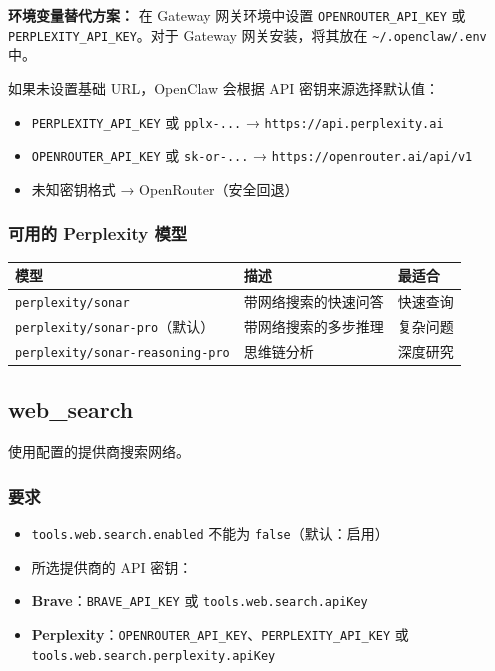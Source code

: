 \textbf{环境变量替代方案：} 在 Gateway 网关环境中设置 \texttt{OPENROUTER\_API\_KEY} 或 \texttt{PERPLEXITY\_API\_KEY}。对于 Gateway 网关安装，将其放在 \texttt{\textasciitilde{}/.openclaw/.env} 中。

如果未设置基础 URL，OpenClaw 会根据 API 密钥来源选择默认值：

\begin{itemize}
  \item \texttt{PERPLEXITY\_API\_KEY} 或 \texttt{pplx-...} → \texttt{https://api.perplexity.ai}
  \item \texttt{OPENROUTER\_API\_KEY} 或 \texttt{sk-or-...} → \texttt{https://openrouter.ai/api/v1}
  \item 未知密钥格式 → OpenRouter（安全回退）
\end{itemize}


\subsubsection{可用的 Perplexity 模型}



\begin{table}[h]
\centering
\small
\begin{tabular}{|l|l|l|}
\hline
模型 & 描述 & 最适合 \\
\hline
\texttt{perplexity/sonar} & 带网络搜索的快速问答 & 快速查询 \\
\hline
\texttt{perplexity/sonar-pro}（默认） & 带网络搜索的多步推理 & 复杂问题 \\
\hline
\texttt{perplexity/sonar-reasoning-pro} & 思维链分析 & 深度研究 \\
\hline
\end{tabular}
\end{table}



\subsection{web\_search}


使用配置的提供商搜索网络。

\subsubsection{要求}


\begin{itemize}
  \item \texttt{tools.web.search.enabled} 不能为 \texttt{false}（默认：启用）
  \item 所选提供商的 API 密钥：
  \item \textbf{Brave}：\texttt{BRAVE\_API\_KEY} 或 \texttt{tools.web.search.apiKey}
  \item \textbf{Perplexity}：\texttt{OPENROUTER\_API\_KEY}、\texttt{PERPLEXITY\_API\_KEY} 或 \texttt{tools.web.search.perplexity.apiKey}
\end{itemize}


